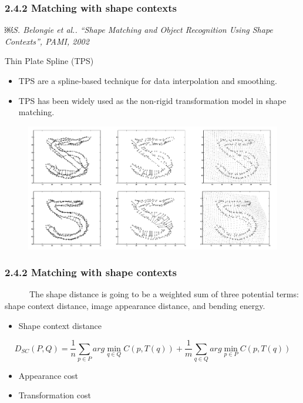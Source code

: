 \documentclass[notheorems,serif,table,compress]{beamer}  %
\begin{document}
\begin{frame}
\frametitle{2.4.2 Matching with shape contexts}
￼\emph{S. Belongie \textit{et al.}. ``Shape Matching and Object Recognition Using Shape Contexts'', PAMI, 2002}\newline

{\color{blue}Thin  Plate  Spline (TPS)}
\begin{itemize}
\item TPS are a spline-based technique for data interpolation and smoothing. 
\item TPS has been widely used as the non-rigid transformation model in shape matching.
\end{itemize}
        \begin{figure}
        \includegraphics[width=0.7\linewidth]{tps} 
        \end{figure}
\end{frame}

\begin{frame}
\frametitle{2.4.2 Matching with shape contexts}
~~~~~~The shape distance is going to be a weighted sum of three potential terms: {\color{blue}shape context distance}, {\color{blue}image appearance distance}, and {\color{blue}bending energy}.\newline

    \begin{itemize}
        \item Shape context distance
    \end{itemize}
    \begin{displaymath}
D_{SC}(P,Q)=\frac{1}{n}\sum_{p \in P}arg \min_{q \in Q}C(p,T(q))+\frac{1}{m}\sum_{q \in Q}arg \min_{p \in P}C(p,T(q))
    \end{displaymath}
    \begin{itemize}
        \item Appearance cost
        \item Transformation cost
    \end{itemize}
\end{frame}
\end{document}
